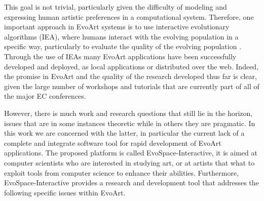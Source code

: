 \documentclass{sig-alternate}
\begin{document}
This goal is not trivial, particularly given the difficulty of modeling and expressing human artistic preferences in a computational system.
Therefore, one important approach in EvoArt systems is to use interactive evolutionary algorithms (IEA),
where humans interact with the evolving population in a specific way, particularly to evaluate the quality of the evolving population \cite{ie1,ie2}.
Through the use of IEAs many EvoArt applications have been successfully developed and deployed, as local applications or distributed over the web.
Indeed, the promise in EvoArt and the quality of the research developed thus far is clear, given the large number of workshops and tutorials that
are currently part of all of the major EC conferences.

However, there is much work and research questions that still lie in the horizon, issues that are in some instances theoretic while in others they are pragmatic.
In this work we are concerned with the latter, in particular the current lack of a complete and integrate software tool for rapid development
of EvoArt applications.
The proposed platform is called EvoSpace-Interactive, it is aimed at computer scientists who are interested in studying art, or at artists that what
to exploit tools from computer science to enhance their abilities.
Furthermore, EvoSpace-Interactive provides a research and development tool that addresses the following specific issues within EvoArt.
\end{document}
